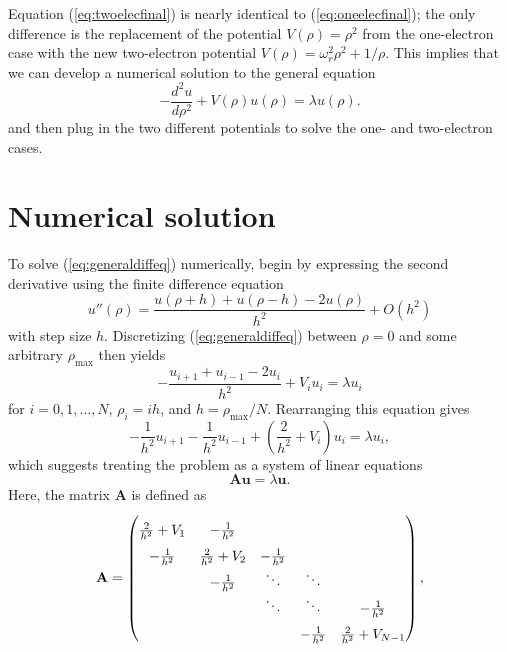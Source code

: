 \documentclass[aps,prc,reprint]{revtex4-1}
\begin{document}
        Equation (\ref{eq:twoelecfinal}) is nearly identical to (\ref{eq:oneelecfinal}); the only difference is the replacement of the potential $V(\rho) = \rho^2$ from the one-electron case with the new two-electron potential $V(\rho) = \omega_r^2 \rho^2 + 1/\rho$. This implies that we can develop a numerical solution to the general equation
        \begin{equation}
            -\frac{d^2 u}{d\rho^2} + V(\rho) u(\rho) = \lambda u(\rho). \label{eq:generaldiffeq}
        \end{equation}
        and then plug in the two different potentials to solve the one- and two-electron cases.


\section{Numerical solution}
\label{sec:numsoln}
    To solve (\ref{eq:generaldiffeq}) numerically, begin by expressing the second derivative using the finite difference equation
    \begin{equation}
        u''(\rho) = \frac{u(\rho + h) + u(\rho - h) - 2u(\rho)}{h^2} + O(h^2)  \label{eq:findiff}
    \end{equation}
    with step size $h$. Discretizing (\ref{eq:generaldiffeq}) between $\rho = 0$ and some arbitrary $\rho_\text{max}$ then yields
    \begin{equation}
        -\frac{u_{i+1} + u_{i-1} - 2u_i}{h^2} + V_i u_i = \lambda u_i
    \end{equation}
    for $i=0,1,\dots,N$, $\rho_i = ih$, and $h = \rho_\text{max} / N$. Rearranging this equation gives
    \begin{equation}
        - \frac{1}{h^2} u_{i+1} - \frac{1}{h^2} u_{i-1} + \left(\frac{2}{h^2} + V_i\right)u_i = \lambda u_i,
    \end{equation}
    which suggests treating the problem as a system of linear equations
    \begin{equation}
        \mathbf{A}\mathbf{u} = \lambda \mathbf{u}.
    \end{equation}
    Here, the matrix $\mathbf{A}$ is defined as
    \begin{equation}
        \mathbf{A} =
        \begin{pmatrix}
            \frac{2}{h^2}+V_1 & -\frac{1}{h^2}    &                &        & \vphantom{\ddots} \\
            -\frac{1}{h^2}    & \frac{2}{h^2}+V_2 & -\frac{1}{h^2} &        & \vphantom{\ddots} \\
                              & -\frac{1}{h^2}    & \ddots         & \ddots &                   \\
                              &                   & \ddots         & \ddots & -\frac{1}{h^2}    \\
            \vphantom{\ddots} &                   &             & -\frac{1}{h^2} & \frac{2}{h^2}+V_{N-1} \\
        \end{pmatrix},
    \end{equation}
\end{document}
